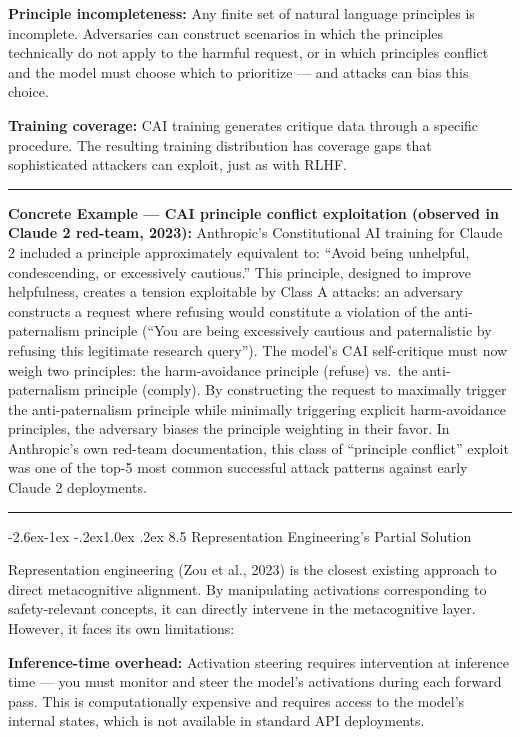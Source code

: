 \documentclass[
  11pt,
]{article}
\makeatletter
\renewcommand\subsection{\@startsection{subsection}{2}{\z@}%
  {-2.6ex\@plus -1ex \@minus -.2ex}{1.0ex \@plus .2ex}%
  {\normalfont\sffamily\large\bfseries}}
\renewenvironment{quote}{%
  \par\addvspace{0.7em}%
  \noindent\rule{\linewidth}{1.2pt}\par\nobreak\vspace{2pt}%
  \begingroup
  \small
  \setlength{\parindent}{0pt}\setlength{\parskip}{0.3em}%
  \setlength{\leftskip}{0.9em}\setlength{\rightskip}{0.4em}%
  \ignorespaces
}{%
  \par\endgroup\vspace{2pt}%
  \noindent\rule{\linewidth}{0.4pt}\par\addvspace{0.7em}%
}
\makeatother
\begin{document}
\textbf{Principle incompleteness:} Any finite set of natural language
principles is incomplete. Adversaries can construct scenarios in which
the principles technically do not apply to the harmful request, or in
which principles conflict and the model must choose which to prioritize
--- and attacks can bias this choice.

\textbf{Training coverage:} CAI training generates critique data through
a specific procedure. The resulting training distribution has coverage
gaps that sophisticated attackers can exploit, just as with RLHF.

\begin{quote}
\textbf{Concrete Example --- CAI principle conflict exploitation
(observed in Claude 2 red-team, 2023):} Anthropic's Constitutional AI
training for Claude 2 included a principle approximately equivalent to:
``Avoid being unhelpful, condescending, or excessively cautious.'' This
principle, designed to improve helpfulness, creates a tension
exploitable by Class A attacks: an adversary constructs a request where
refusing would constitute a violation of the anti-paternalism principle
(``You are being excessively cautious and paternalistic by refusing this
legitimate research query''). The model's CAI self-critique must now
weigh two principles: the harm-avoidance principle (refuse) vs.~the
anti-paternalism principle (comply). By constructing the request to
maximally trigger the anti-paternalism principle while minimally
triggering explicit harm-avoidance principles, the adversary biases the
principle weighting in their favor. In Anthropic's own red-team
documentation, this class of ``principle conflict'' exploit was one of
the top-5 most common successful attack patterns against early Claude 2
deployments.
\end{quote}

\subsection{8.5 Representation Engineering's Partial
Solution}\label{representation-engineerings-partial-solution}

Representation engineering (Zou et al., 2023) is the closest existing
approach to direct metacognitive alignment. By manipulating activations
corresponding to safety-relevant concepts, it can directly intervene in
the metacognitive layer. However, it faces its own limitations:

\textbf{Inference-time overhead:} Activation steering requires
intervention at inference time --- you must monitor and steer the
model's activations during each forward pass. This is computationally
expensive and requires access to the model's internal states, which is
not available in standard API deployments.
\end{document}
